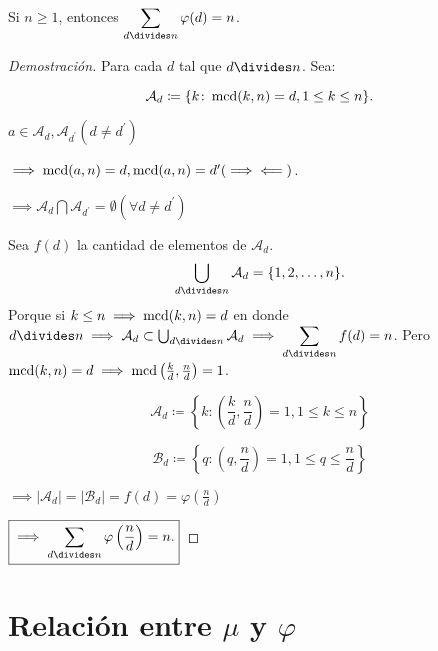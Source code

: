\begin{theorem}
	Si $n\geq1$, entonces $\displaystyle\sum_{d\divides n}\varphi(d)=n$.
\begin{proof}[Demostración]
	Para cada $d$ tal que $d\divides n$. Sea$\colon$
	
	\[\mathcal{A}_d\coloneq\{k\colon\operatorname{mcd}(k,n)=d, 1\leq k\leq n\}.\]
	
	$a\in\mathcal{A}_d, \mathcal{A}_{d^{\prime}} (d\neq d^{\prime})$
	
	$\implies \operatorname{mcd}(a,n)=d, \operatorname{mcd}(a,n)=d^{\prime} (\implies\impliedby)$.
	
	$\implies \mathcal{A}_{d}\bigcap\mathcal{A}_{d^{\prime}}=\emptyset (\forall d\neq d^{\prime})$
	
	Sea $f(d)$ la cantidad de elementos de $\mathcal{A}_{d}$.
	\[\bigcup_{d\divides n}\mathcal{A}_{d}=\{1,2,\ldots,n\}.%
	\]
	Porque si $k\leq n\implies \operatorname{mcd}(k,n)=d$ en donde $d\divides n\implies \mathcal{A}_{d}\subset\bigcup_{d\divides n}\mathcal{A}_{d}\implies\displaystyle\sum_{d\divides n}f(d)=n$.
	Pero $\operatorname{mcd}(k,n)=d\implies\operatorname{mcd}\left(\frac{k}{d},\frac{n}{d}\right)=1$.
	
	\[\mathcal{A}_{d}\coloneq\left\{k\colon\left(\frac{k}{d},\frac{n}{d}\right)=1, 1\leq k\leq n\right\}\]
	
	\[\mathcal{B}_{d}\coloneq\left\{q\colon\left(q,\frac{n}{d}\right)=1, 1\leq q\leq \frac{n}{d}\right\}\]
	
	$\implies|\mathcal{A}_{d}|=|\mathcal{B}_{d}|=f(d)=\varphi\left(\frac{n}{d}\right)$
	
	$\boxed{\displaystyle\implies\sum_{d\divides n}\varphi\left(\frac{n}{d}\right)=n.}$
\end{proof}
\end{theorem}

\section{Relación entre $\mu$ y $\varphi$}

